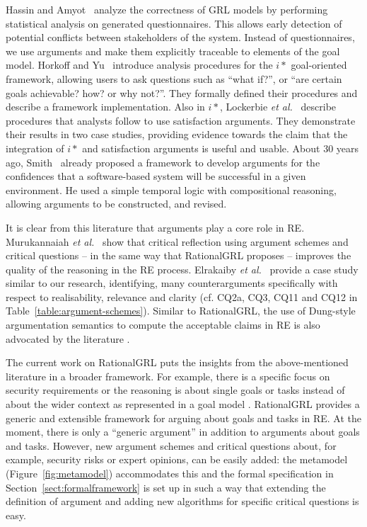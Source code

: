 Hassin and Amyot~\cite{hassine2016questionnaire} analyze the correctness of GRL models by performing statistical analysis on generated questionnaires. This allows early detection of potential conflicts between stakeholders of the system. Instead of questionnaires, we use arguments and make them explicitly traceable to elements of the goal model. Horkoff and Yu~\cite{horkoff2016interactive} introduce analysis procedures for the $i*$ goal-oriented framework, allowing users to ask questions such as ``what if?'', or ``are certain goals achievable? how? or why not?''. They formally defined their procedures and describe a framework implementation. Also in $i*$, Lockerbie \emph{et al.}~\cite{lockerbie2012exploring} describe procedures that analysts follow to use satisfaction arguments. They demonstrate their results in two case studies, providing evidence towards the claim that the integration of $i*$ and satisfaction arguments is useful and usable. About 30 years ago, Smith~\cite{Smith:1997:CRF:2737426.2737493} already proposed a framework to develop arguments for the confidences that a software-based system will be successful in a given environment. He used a simple temporal logic with compositional reasoning, allowing arguments to be constructed, and revised. 

It is clear from this literature that arguments play a core role in RE. Murukannaiah \emph{et al.}~\cite{murukannaiah2015} show that critical reflection using argument schemes and critical questions -- in the same way that RationalGRL proposes -- improves the quality of the reasoning in the RE process. Elrakaiby \emph{et al.}~\cite{ElrakaibyFSGN17} provide a case study similar to our research, identifying, many counterarguments specifically with respect to realisability, relevance and clarity (cf. CQ2a, CQ3, CQ11 and CQ12 in Table~\ref{table:argument-schemes}). Similar to RationalGRL, the use of Dung-style argumentation semantics to compute the acceptable claims in RE is also advocated by the literature \cite{yu2015automated,ionita2014argumentation,ElrakaibyFSGN17}. 

The current work on RationalGRL puts the insights from the above-mentioned literature in a broader framework. For example, there is a specific focus on security requirements \cite{haley2008security,yu2015automated,ionita2014argumentation} or the reasoning is about single goals or tasks instead of about the wider context as represented in a goal model \cite{haley2008security,yu2015automated,murukannaiah2015,ElrakaibyFSGN17}. RationalGRL provides a generic and extensible framework for arguing about goals and tasks in RE. At the moment, there is only a ``generic argument'' in addition to arguments about goals and tasks. However, new argument schemes and critical questions about, for example, security risks or expert opinions, can be easily added: the metamodel (Figure~\ref{fig:metamodel}) accommodates this and the formal specification in Section~\ref{sect:formalframework} is set up in such a way that extending the definition of argument and adding new algorithms for specific critical questions is easy. 

